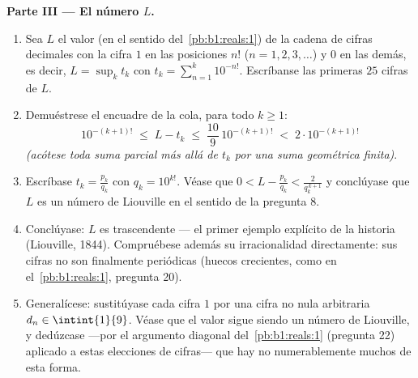 \begin{problem}
\medskip
\noindent\textbf{Parte III --- El número $L$.}
\begin{enumerate}[resume]
  \item Sea $L$ el valor (en el sentido del~\cref{pb:b1:reals:1}) de
        la cadena de cifras decimales con la cifra $1$ en las
        posiciones $n!$ ($n = 1, 2, 3, \dots$) y $0$ en las demás, es
        decir, $L = \sup_k t_k$ con $t_k = \sum_{n=1}^{k} 10^{-n!}$.
        Escríbanse las primeras $25$ cifras de $L$.
  \item Demuéstrese el encuadre de la cola, para todo $k \geq 1$:
        \[
        10^{-(k+1)!} \;\leq\; L - t_k \;\leq\;
        \frac{10}{9}\,10^{-(k+1)!} \;<\; 2\cdot 10^{-(k+1)!}
        \]
        \emph{(acótese toda suma parcial más allá de $t_k$ por una
        suma geométrica finita)}.
  \item Escríbase $t_k = \frac{p_k}{q_k}$ con $q_k = 10^{k!}$.
        Véase que $0 < L - \frac{p_k}{q_k} < \frac{2}{q_k^{\,k+1}}$ y
        conclúyase que $L$ es un número de Liouville en el sentido de
        la pregunta 8.
  \item Conclúyase: $L$ es trascendente --- el primer ejemplo
        explícito de la historia (Liouville, 1844). Compruébese
        además su irracionalidad directamente: sus cifras no son
        finalmente periódicas (huecos crecientes, como en
        el~\cref{pb:b1:reals:1}, pregunta 20).
  \item Generalícese: sustitúyase cada cifra $1$ por una cifra no
        nula arbitraria $d_n \in \intint{1}{9}$. Véase que el valor
        sigue siendo un número de Liouville, y dedúzcase ---por el
        argumento diagonal del~\cref{pb:b1:reals:1} (pregunta 22)
        aplicado a estas elecciones de cifras--- que hay no
        numerablemente muchos  de esta forma.
\end{enumerate}


\end{problem}
